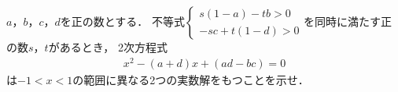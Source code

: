 \documentclass[../../main.tex]{subfiles}
\begin{document}
$a$，$b$，$c$，$d$を正の数とする．
不等式$
\begin{cases} s(1-a)-tb>0 \\ -sc+t(1-d)>0
\end{cases}$を同時に満たす正の数$s$，$t$があるとき，
2次方程式
\begin{align*}
  x^2-(a+d)x+(ad-bc)=0
\end{align*}
は$-1<x<1$の範囲に異なる2つの実数解をもつことを示せ．
\end{document}
